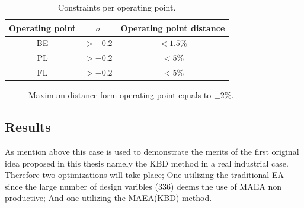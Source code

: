 \begin{table}[h!]
\begin{center}
\begin{tabular}{ |c|c|c| }
\hline
Operating point & $\sigma$ & Operating point distance\\
\hline
BE & $> -0.2$ & $<1.5\%$\\
\hline
PL       & $> -0.2$ & $<5\%$\\
\hline
FL       & $> -0.2$ & $<5\%$\\
\hline
\end{tabular}
\caption{Constraints per operating point.}
\label{Cons}
\end{center}
\end{table}


\begin{figure}[h!]
\begin{minipage}[b]{1\linewidth}
 \centering
\end{minipage}
\caption{Maximum distance form operating point equals to $\pm2\%$.}
\label{design-obj3}
\end{figure}

\subsection{Results}
As mention above this case is used to demonstrate the merits of the first original idea proposed in this thesis namely the KBD method in a real industrial case. Therefore two optimizations will take place; One utilizing the traditional EA since the large number of design varibles ($336$) deems the use of MAEA non productive; And one utilizing the MAEA(KBD) method.


